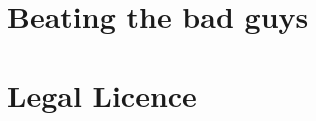 \documentclass[12pt,twoside,onecolumn,openright,extrafontsizes]{memoir}
\begin{document}
\clearpage
\tableofcontents*

\mainmatter
\chapter{Beating the bad guys}

% 

\chapter{Legal Licence}


\end{document}
